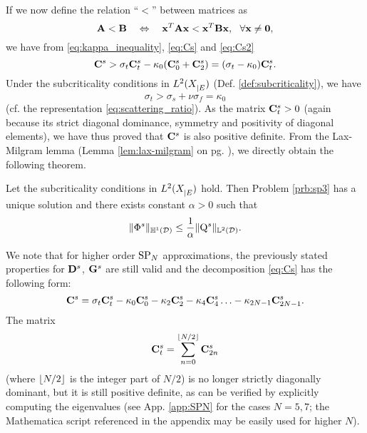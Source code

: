 If we now define the relation ``$<$'' between matrices as
$$
	\mat{A} < \mat{B}\quad \Leftrightarrow \quad \mat{x}^T \mat{A} \mat{x} < \mat{x}^T \mat{B} \mat{x},\ \ \forall \mat{x}
	\neq \mat{0}, 
$$
we have from \eqref{eq:kappa_inequality}, \eqref{eq:Cs} and \eqref{eq:Cs2}
$$
	\mat{C}^s > \sigma_t\mat{C}^s_t - \kappa_0(\mat{C}^s_0 + \mat{C}^s_2) = (\sigma_t - \kappa_0)\mat{C}^s_t.
$$
Under the subcriticality conditions in $\Lp[2](\XE)$ (Def. \ref{def:subcriticality}), we have 
$$
	\sigma_t > \sigma_s + \nu\sigma_f = \kappa_0
$$
(cf. the representation \eqref{eq:scattering_ratio}). As the matrix $\mat{C}^s_t > 0$ (again because its strict
diagonal dominance, symmetry and positivity of diagonal elements), we have thus proved that $\mat{C}^s$ is also positive
definite. From the Lax-Milgram lemma (Lemma \ref{lem:lax-milgram} on pg. \pageref{lem:lax-milgram}), we directly
obtain the following theorem.

\begin{theorem}\label{thm:well-posedness-sp3}
	Let the subcriticality conditions in $\Lp[2](\XE)$ hold. Then Problem \ref{prb:sp3} has a unique solution and there
	exists constant $\alpha > 0$ such that
	$$
		\norm[{\mathbb{H}^1(\VV)}]{\Phi^s} \leq \frac{1}{\alpha} \norm[{\LL\VV}]{\mathrm{Q}^s}.
	$$
\end{theorem}
\begin{remark}\label{rem:well-posedness-sp3}
We note that for higher order $\SPN$ approximations, the previously stated properties for $\mat{D}^s$, $\mat{G}^s$ are
still valid and the decomposition \eqref{eq:Cs} has the following form:
$$
	\mat{C}^s = \sigma_t\mat{C}^s_t - \kappa_0 \mat{C}^s_0 - \kappa_2 \mat{C}^s_2 - \kappa_4 \mat{C}^s_4 \ldots -
	\kappa_{2N-1} \mat{C}^s_{2N-1}.
$$
The matrix 
$$
	\mat{C}^s_t = \sum_{n=0}^{\floor{N/2}} \mat{C}^s_{2n}
$$
(where $\floor{N/2}$ is the integer part of $N/2$) is no longer strictly diagonally dominant, but it is still positive
definite, as can be verified by explicitly computing the eigenvalues (see App. \ref{app:SPN} for the cases $N = 5,7$; the Mathematica script
referenced in the appendix may be easily used for higher $N$).
\end{remark}
